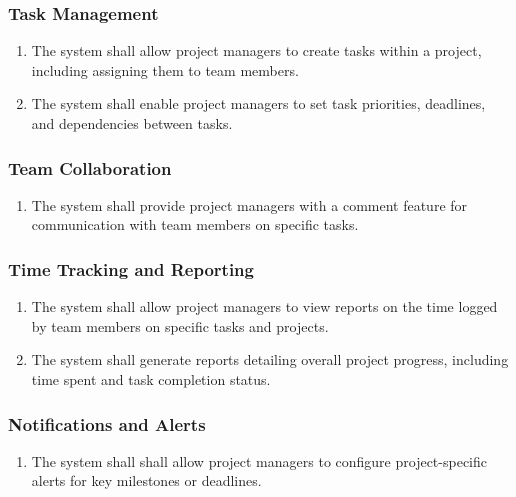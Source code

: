\documentclass[]{article}
\begin{document}
            \subsubsection{Task Management}
            \begin{enumerate}[label=\scriptsize\textbf{\textcolor{gray}{FR-PM-\arabic{pmCounter}}}, leftmargin=*, itemsep=-4px]
               \item The system shall allow project managers to create tasks within a project, including assigning them to team members.
               \item The system shall enable project managers to set task priorities, deadlines, and dependencies between tasks.
            \end{enumerate}

            \subsubsection{Team Collaboration}
            \begin{enumerate}[label=\scriptsize\textbf{\textcolor{gray}{FR-PM-\arabic{pmCounter}}}, leftmargin=*, itemsep=-4px]
                \item The system shall provide project managers with a comment feature for communication with team members on specific tasks.
            \end{enumerate}
                    
            \subsubsection{Time Tracking and Reporting}
            \begin{enumerate}[label=\scriptsize\textbf{\textcolor{gray}{FR-PM-\arabic{pmCounter}}}, leftmargin=*, itemsep=-4px]
               \item The system shall allow project managers to view reports on the time logged by team members on specific tasks and projects.
               \item The system shall generate reports detailing overall project progress, including time spent and task completion status.
            \end{enumerate}

            \subsubsection{Notifications and Alerts}
            \begin{enumerate}[label=\scriptsize\textbf{\textcolor{gray}{FR-PM-\arabic{pmCounter}}}, leftmargin=*, itemsep=-4px]
                \item The system shall shall allow project managers to configure project-specific alerts for key milestones or deadlines.
            \end{enumerate}
\end{document}
